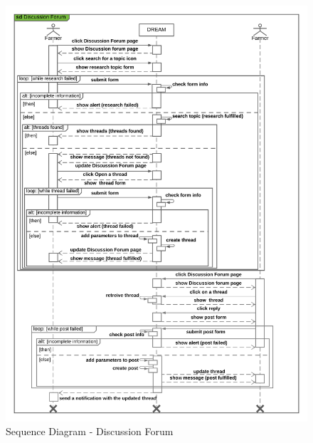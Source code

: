 \begin{center}
    \begin{figure}[H]
  \includegraphics[width=\textwidth,height=\textheight,keepaspectratio]{./Images/Sequence Diagram Discussion Forum.png}
  \caption{Sequence Diagram - Discussion Forum}
\end{figure}
\end{center}



